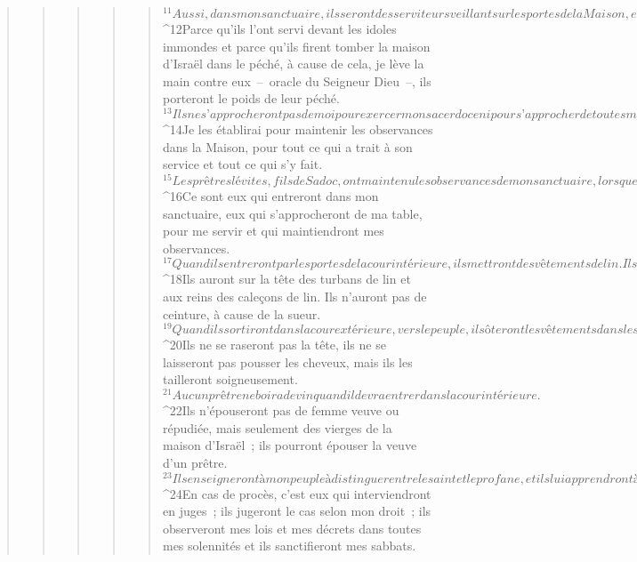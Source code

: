 \begin{verse}
\begin{verse}
\begin{verse}
\begin{verse}
\begin{verse}
${}^{11}Aussi, dans mon sanctuaire, ils seront des serviteurs veillant sur les portes de la Maison, et des serviteurs de la Maison : c’est eux qui immoleront les victimes de l’holocauste et du sacrifice pour le peuple ; et c’est eux qui se tiendront devant le peuple pour le servir. 
${}^{12}Parce qu’ils l’ont servi devant les idoles immondes et parce qu’ils firent tomber la maison d’Israël dans le péché, à cause de cela, je lève la main contre eux – oracle du Seigneur Dieu –, ils porteront le poids de leur péché. 
${}^{13}Ils ne s’approcheront pas de moi pour exercer mon sacerdoce ni pour s’approcher de toutes mes choses saintes, des choses très saintes ; ils porteront le poids de leur déshonneur et des abominations qu’ils ont commises. 
${}^{14}Je les établirai pour maintenir les observances dans la Maison, pour tout ce qui a trait à son service et tout ce qui s’y fait.
${}^{15}Les prêtres lévites, fils de Sadoc, ont maintenu les observances de mon sanctuaire, lorsque les fils d’Israël erraient loin de moi : ce sont eux qui s’approcheront de moi pour me servir ; ils se tiendront devant moi pour me présenter la graisse et le sang – oracle du Seigneur Dieu. 
${}^{16}Ce sont eux qui entreront dans mon sanctuaire, eux qui s’approcheront de ma table, pour me servir et qui maintiendront mes observances. 
${}^{17}Quand ils entreront par les portes de la cour intérieure, ils mettront des vêtements de lin. Ils ne porteront pas de laine, quand ils officieront aux portes de la cour intérieure et dans la Maison. 
${}^{18}Ils auront sur la tête des turbans de lin et aux reins des caleçons de lin. Ils n’auront pas de ceinture, à cause de la sueur. 
${}^{19}Quand ils sortiront dans la cour extérieure, vers le peuple, ils ôteront les vêtements dans lesquels ils auront officié et les déposeront dans des salles du sanctuaire. Ils prendront d’autres vêtements afin de ne pas communiquer la sainteté au peuple par leurs vêtements. 
${}^{20}Ils ne se raseront pas la tête, ils ne se laisseront pas pousser les cheveux, mais ils les tailleront soigneusement. 
${}^{21}Aucun prêtre ne boira de vin quand il devra entrer dans la cour intérieure. 
${}^{22}Ils n’épouseront pas de femme veuve ou répudiée, mais seulement des vierges de la maison d’Israël ; ils pourront épouser la veuve d’un prêtre. 
${}^{23}Ils enseigneront à mon peuple à distinguer entre le saint et le profane, et ils lui apprendront à distinguer entre le pur et l’impur. 
${}^{24}En cas de procès, c’est eux qui interviendront en juges ; ils jugeront le cas selon mon droit ; ils observeront mes lois et mes décrets dans toutes mes solennités et ils sanctifieront mes sabbats. 

\end{verse}
\end{verse}
\end{verse}
\end{verse}
\end{verse}
